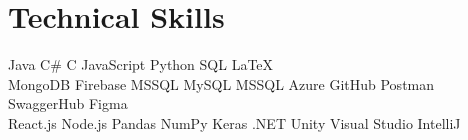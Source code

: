\documentclass[]{deedy-resume-openfont}
\begin{document}

\section{Technical Skills}

Java \textbullet{}   C\# \textbullet{} C \textbullet{} JavaScript \textbullet{}
Python \textbullet{} SQL \textbullet{} LaTeX \\ 

MongoDB \textbullet{} Firebase \textbullet{} MSSQL \textbullet{} MySQL \textbullet{} MSSQL \textbullet{} Azure \textbullet{} GitHub  
 \textbullet{} Postman \textbullet{} SwaggerHub \textbullet{} Figma\\
React.js \textbullet{} Node.js \textbullet{} Pandas \textbullet{} NumPy \textbullet{}
Keras \textbullet{} .NET \textbullet{} Unity \textbullet{} Visual Studio \textbullet{} IntelliJ
\sectionsep

\hfill
\end{document}
